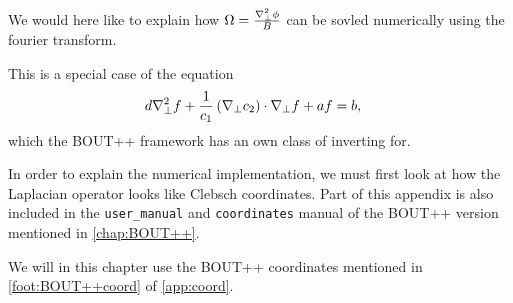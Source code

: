 We would here like to explain how $\Omega = \frac{\nabla_\perp^2\phi}{B}$ can be sovled numerically using the fourier transform.

This is a special case of the equation
%
\begin{align}
    d&\nabla_\perp^2f + \frac{1}{c_1}\left(\nabla_\perp c_2\right)\cdot\nabla_\perp f + af = b,
\label{eq:to_invert_tri}
\end{align}
%
which the BOUT++ framework has an own class of inverting for.

In order to explain the numerical implementation, we must first look at how the Laplacian operator looks like Clebsch coordinates.
Part of this appendix is also included in the \texttt{user\_manual} and \texttt{coordinates} manual of the BOUT++ version mentioned in \cref{chap:BOUT++}.

We will in this chapter use the BOUT++ coordinates mentioned in \cref{foot:BOUT++coord} of \cref{app:coord}.

